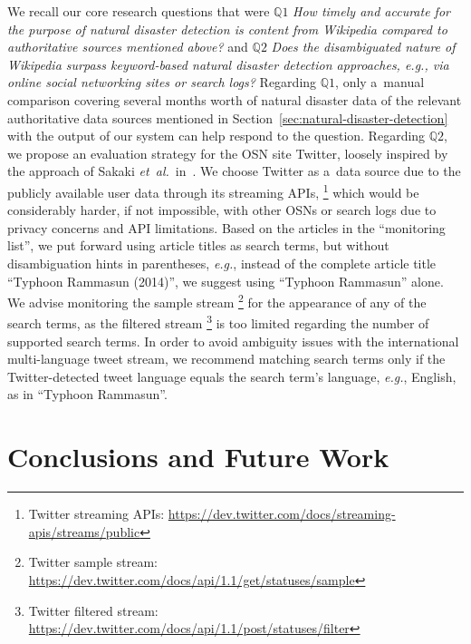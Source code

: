 \documentclass[letterpaper]{article}
\begin{document}
We recall our core research questions that were
$\mathbb{Q}1$ \emph{How timely and accurate for the purpose
of natural disaster detection is content from Wikipedia
compared to authoritative sources mentioned above?} and
$\mathbb{Q}2$ \emph{Does the disambiguated nature of Wikipedia
surpass keyword-based natural disaster detection approaches,
\emph{e.g.}, via online social networking sites or search logs?}
Regarding $\mathbb{Q}1$, only a~manual comparison
covering several months worth
of natural disaster data of the relevant authoritative data sources
mentioned in Section~\ref{sec:natural-disaster-detection}
with the output of our system can help respond to the question.
Regarding $\mathbb{Q}2$, we propose an evaluation strategy
for the OSN site Twitter,
loosely inspired by the approach of Sakaki \emph{et~al.}\
in~\cite{sakaki2010earthquake}.
We choose Twitter as a~data source due to the publicly available user data
through its streaming APIs,%
\footnote{Twitter streaming APIs:
\url{https://dev.twitter.com/docs/streaming-apis/streams/public}}
which would be considerably harder, if not impossible, with other OSNs or search logs
due to privacy concerns and API limitations.
Based on the articles in the ``monitoring list'',
we put forward using article titles as search terms,
but without disambiguation hints in parentheses,
\emph{e.g.}, instead of the complete article title
``Typhoon Rammasun (2014)'', we suggest using ``Typhoon Rammasun'' alone.
We advise monitoring the sample stream%
\footnote{Twitter sample stream:
\url{https://dev.twitter.com/docs/api/1.1/get/statuses/sample}}
for the appearance of any of the search terms,
as the filtered stream%
\footnote{Twitter filtered stream:
\url{https://dev.twitter.com/docs/api/1.1/post/statuses/filter}}
is too limited regarding the number of supported search terms.
In order to avoid ambiguity issues with the
international multi-language tweet stream,
we recommend matching search terms only
if the Twitter-detected tweet language equals
the search term's language, \emph{e.g.}, English, as in ``Typhoon Rammasun''.

\section{Conclusions and Future Work}
\end{document}
